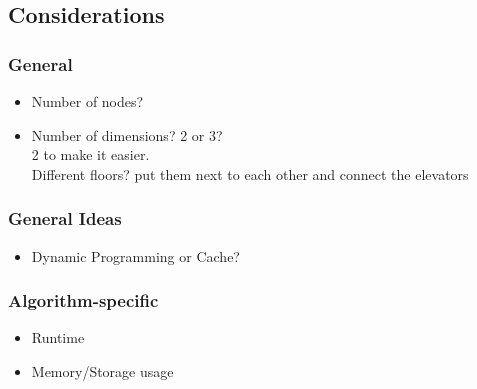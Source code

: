 \documentclass[11pt,a4paper]{article}
\begin{document}
\subsection{Considerations}
\subsubsection[short]{General}
\begin{itemize}
    \item Number of nodes?
    \item Number of dimensions? 2 or 3?\\
          2 to make it easier.\\
          Different floors? put them next to each other and connect the elevators
\end{itemize}

\subsubsection{General Ideas}
\begin{itemize}
    \item Dynamic Programming or Cache?
\end{itemize}
\subsubsection{Algorithm-specific}
\begin{itemize}
    \item Runtime
    \item Memory/Storage usage
\end{itemize}
\end{document}
